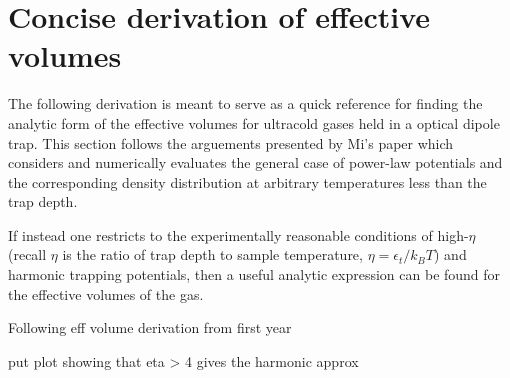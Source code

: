 \chapter{Concise derivation of effective volumes}
\label{app:effective_volumes}

The following derivation is meant to serve as a quick reference for finding the analytic form of the effective volumes for ultracold gases held in a optical dipole trap. This section follows the arguements presented by Mi's paper which considers and numerically evaluates the general case of power-law potentials and the corresponding density distribution at arbitrary temperatures less than the trap depth.

If instead one restricts to the experimentally reasonable conditions of high-$\eta$ (recall $\eta$ is the ratio of trap depth to sample temperature, $\eta=\epsilon_t/k_B T$) and harmonic trapping potentials, then a useful analytic expression can be found for the effective volumes of the gas.

Following eff volume derivation from first year

put plot showing that eta > 4 gives the harmonic approx